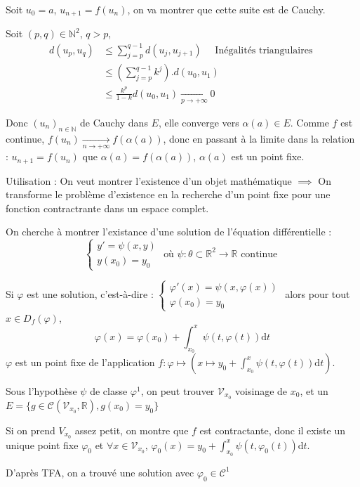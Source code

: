 \begin{myproof}{}{}

Soit $u_0 = a$, $u _{n+1} = f(u_n)$, on va montrer que cette suite est de Cauchy.

Soit $(p,q) \in \mathbb{N} ^{2}$, $q>p$, 
\begin{align*}
  d(u_p, u_q) &\le \sum_{j=p}^{q-1} d(u_j, u _{j+1}) \quad \text{ Inégalités triangulaires } \\
              &\le \left( \sum_{j=p}^{q-1} k ^{j}\right) . d(u_0, u_1)\\
              &\le \frac{k ^{p}}{1-k} d(u_0, u_1)  \underset{p \to + \infty}{\longrightarrow} 0
\end{align*}

Donc $(u_n)_{n\in \mathbb{N}}$ de Cauchy dans $E$, elle converge vers $\alpha(a)\in E$. Comme $f$ est continue, $f(u_n)  \underset{n \to + \infty}{\longrightarrow} f(\alpha(a))$, donc en passant à la limite dans la relation : $u _{n+1} = f(u_n)$ que $\alpha(a) = f(\alpha(a))$, $\alpha(a)$ est un point fixe. 

\end{myproof}

Utilisation : On veut montrer l'existence d'un objet mathématique $\implies$ On transforme le problème d'existence en la recherche d'un point fixe pour une fonction contractrante dans un espace complet.

\begin{Example}{}{}
On cherche à montrer l'existance d'une solution de l'équation différentielle :
\[
\begin{cases}
    y' = \psi (x, y) \\
    y(x_0) = y_0
  \end{cases} \text{ où } \psi : \theta \subset \mathbb{R}^{2} \to \mathbb{R} \text{ continue }
\]
\end{Example}

\begin{myproof}{}{}
Si $\varphi$ est une solution, c'est-à-dire : $\begin{cases}
  \varphi'(x) = \psi(x, \varphi(x)) \\ \varphi(x_0) = y_0
\end{cases}$ alors pour tout $x \in D_f( \varphi)$, 
\[
  \varphi(x) = \varphi(x_0) + \displaystyle\int_{x_0}^{x} \psi(t, \varphi(t)) \mathrm{d}t
\]
$\varphi$ est un point fixe de l'application $f : \varphi \mapsto \left(x \mapsto y_0+ \int_{x_0}^{x}\psi(t, \varphi(t) )\mathrm{d}t \right)$.

Sous l'hypothèse $\psi$ de classe $\varphi ^{1}$, on peut trouver $\mathcal{V}_{x_0}$ voisinage de $x_0$, et un $E = \{g \in \mathcal{C}( \mathcal{V} _{x_0}, \mathbb{R}), g(x_0)=y_0\}$


Si on prend $V _{x_0}$ assez petit, on montre que $f$ est contractante, donc il existe un unique point fixe $\varphi_0$ et $\forall x \in \mathcal{V}_{x_0}$, $\varphi_0(x) = y_0 + \int _{x_0} ^{x} \psi (t, \varphi_0(t)) \mathrm{d}t$.

D'après TFA, on a trouvé une solution avec $\varphi_0 \in \mathcal{C}^{1}$
\end{myproof}

